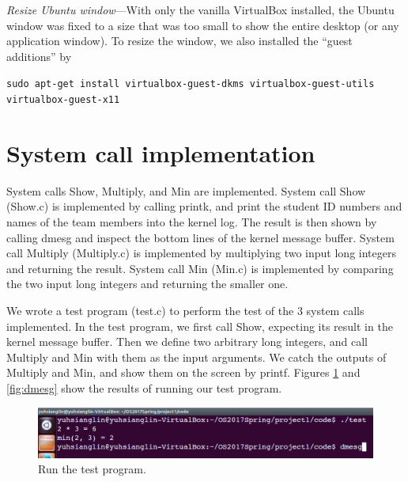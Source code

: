 \documentclass[twoside, 11pt, tablecaption=bottom]{article}
\begin{document}
	\emph{Resize Ubuntu window}---With only the vanilla VirtualBox installed, the Ubuntu window was fixed to a size that was too small to show the entire desktop (or any application window). To resize the window, we also installed the ``guest additions'' by
	
		\texttt{sudo apt-get install virtualbox-guest-dkms virtualbox-guest-utils virtualbox-guest-x11}




\section{System call implementation}

	System calls Show, Multiply, and Min are implemented. System call Show (Show.c) is implemented by calling printk, and print the student ID numbers and names of the team members into the kernel log. The result is then shown by calling dmesg and inspect the bottom lines of the kernel message buffer. System call Multiply (Multiply.c) is implemented by multiplying two input long integers and returning the result. System call Min (Min.c) is implemented by comparing the two input long integers and returning the smaller one.
	
	We wrote a test program (test.c) to perform the test of the 3 system calls implemented. In the test program, we first call Show, expecting its result in the kernel message buffer. Then we define two arbitrary long integers, and call Multiply and Min with them as the input arguments. We catch the outputs of Multiply and Min, and show them on the screen by printf. Figures \ref{fig:test} and \ref{fig:dmesg} show the results of running our test program.


\begin{figure}
\centering
\includegraphics[width = 15 cm]{test}
\caption{Run the test program.}
\label{fig:test}
\end{figure}

\end{document}
